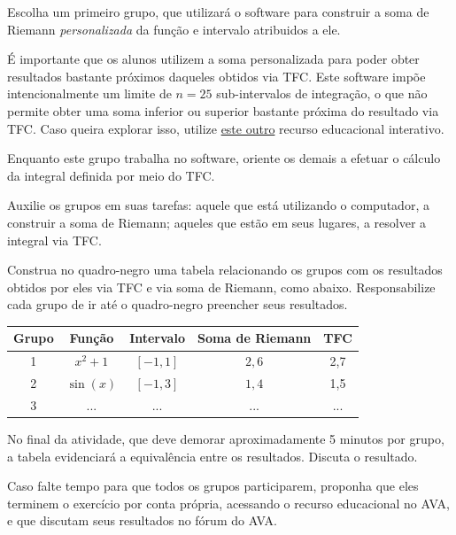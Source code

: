 \documentclass[a4paper,12pt]{scrartcl}
\begin{document}
\begin{list}{.}
	\item Escolha um primeiro grupo, que utilizará o software para construir a soma de Riemann \emph{personalizada} da função e intervalo atribuidos a ele.
	
	É importante que os alunos utilizem a soma personalizada para poder obter resultados bastante próximos daqueles obtidos via TFC.
	Este software impõe intencionalmente um limite de $n = 25$ sub-intervalos de integração, o que não permite obter uma soma inferior
	ou superior bastante próxima do resultado via TFC. Caso queira explorar isso, utilize \href{http://midia.atp.usp.br/atividades-interativas/AI-0108}{este outro} recurso educacional interativo.
	
	\item Enquanto este grupo trabalha no software, oriente os demais a efetuar o cálculo da integral definida por meio do TFC.
	
	\item Auxilie os grupos em suas tarefas: aquele que está utilizando o computador, a construir a soma de Riemann; aqueles que estão em seus lugares, a resolver a integral via TFC.
	
	\item Construa no quadro-negro uma tabela relacionando os grupos com os resultados obtidos por eles via TFC e via soma de Riemann, como abaixo.
	Responsabilize cada grupo de ir até o quadro-negro preencher seus resultados.
	
	\medskip
	\hfill
	\begin{tabular}{ccccc}
	  Grupo & Função & Intervalo & Soma de Riemann & TFC \\
	  \midrule
	  1     & $x^2+1$  & $[-1,1]$   & $2,6$           & 2,7   \\
	  2     & $\sin(x)$  & $[-1,3]$  & $1,4$           & 1,5   \\
	  3     & ...    & ...       & ...             & ...   \\
	  \bottomrule
	\end{tabular}
	\hfill{}
	\medskip
	
	\item No final da atividade, que deve demorar aproximadamente 5 minutos por grupo, a tabela evidenciará a equivalência entre os resultados.
	Discuta o resultado.
	
	Caso falte tempo para que todos os grupos participarem, proponha que eles terminem o exercício por conta própria, acessando o recurso educacional no AVA,
	e que discutam seus resultados no fórum do AVA.
      
      \end{list}
    
\end{document}
